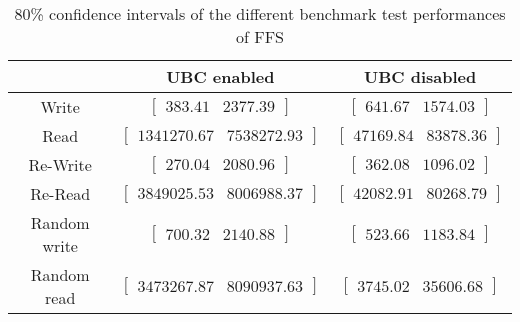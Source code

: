 
	\begin{table}[ht!]
	\caption{80\% confidence intervals of the different benchmark test performances of FFS}
	\begin{tabular}{| c | c | c |}
	\hline
	{} & \textbf{UBC enabled} & \textbf{UBC disabled} \\
	\hline
	\hline
	Write &$\left[ \begin{array}{rr} 383.41 & 2377.39 \end{array}\right] $ &$\left[ \begin{array}{rr} 641.67 & 1574.03 \end{array}\right] $\\ 
Read &$\left[ \begin{array}{rr} 1341270.67 & 7538272.93 \end{array}\right] $ &$\left[ \begin{array}{rr} 47169.84 & 83878.36 \end{array}\right] $\\ 
Re-Write &$\left[ \begin{array}{rr} 270.04 & 2080.96 \end{array}\right] $ &$\left[ \begin{array}{rr} 362.08 & 1096.02 \end{array}\right] $\\ 
Re-Read &$\left[ \begin{array}{rr} 3849025.53 & 8006988.37 \end{array}\right] $ &$\left[ \begin{array}{rr} 42082.91 & 80268.79 \end{array}\right] $\\ 
Random write &$\left[ \begin{array}{rr} 700.32 & 2140.88 \end{array}\right] $ &$\left[ \begin{array}{rr} 523.66 & 1183.84 \end{array}\right] $\\ 
Random read &$\left[ \begin{array}{rr} 3473267.87 & 8090937.63 \end{array}\right] $ &$\left[ \begin{array}{rr} 3745.02 & 35606.68 \end{array}\right] $\\ 

		\hline
		\end{tabular}
		\label{tbl:bootstrap-table-ffs}
		\end{table}
	
